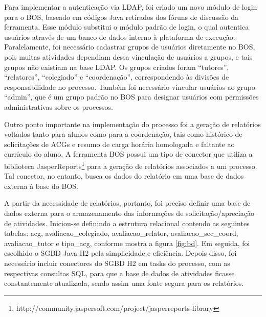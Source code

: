 \documentclass[12pt]{article}
\begin{document}

Para implementar a autenticação via LDAP, foi criado um novo módulo de login para o BOS, baseado em códigos Java retirados dos fóruns de discussão da ferramenta. Esse módulo substitui o módulo padrão de login, o qual autentica usuários através de um banco de dados interno à plataforma de execução. Paralelamente, foi necessário cadastrar grupos de usuários diretamente no BOS, pois muitas atividades dependiam dessa vinculação de usuários a grupos, e tais grupos não existiam na base LDAP. Os grupos criados foram “tutores”, “relatores”, “colegiado” e “coordenação”, correspondendo às divisões de responsabilidade no processo. Também foi necessário vincular usuários ao grupo “admin”, que é um grupo padrão no BOS para designar usuários com permissões administrativas sobre os processos.

Outro ponto importante na implementação do processo foi a geração de relatórios voltados tanto para alunos como para a coordenação, tais como histórico de solicitações de ACGs e resumo de carga horária homologada e faltante ao currículo do aluno. A ferramenta BOS possui um tipo de conector que utiliza a biblioteca JasperReports\footnote{http://community.jaspersoft.com/project/jasperreports-library} para a geração de relatórios associados a um processo. Tal conector, no entanto, busca os dados do relatório em uma base de dados externa à base do BOS.

A partir da necessidade de relatórios, portanto, foi preciso definir uma base de dados externa para o armazenamento das informações de solicitação/apreciação de atividades. Iniciou-se definindo a estrutura relacional contendo as seguintes tabelas: acg, avaliacao\_colegiado, avaliacao\_relator, avaliacao\_sec\_coord, avaliacao\_tutor e tipo\_acg, conforme mostra a figura \ref{fig:bd}. Em seguida, foi escolhido o SGBD Java H2 pela simplicidade e eficiência. Depois disso, foi necessário incluir conectores do SGBD H2 em tasks do processo, com as respectivas consultas SQL, para que a base de dados de atividades ficasse constantemente atualizada, sendo assim uma fonte segura para os relatórios.
\end{document}
